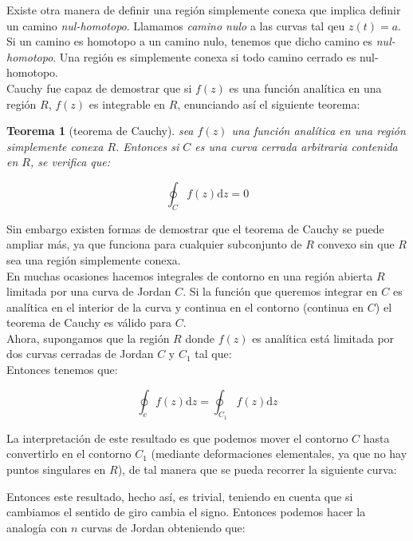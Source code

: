 \documentclass[12pt]{book}
\newcommand{\D}{\mathrm{d}}
\newtheorem{theorem}{Teorema}[section]
\begin{document}
Existe otra manera de definir una región simplemente conexa que implica definir un camino \textit{nul-homotopo}. Llamamos \textit{camino nulo} a las curvas tal qeu $z(t) = a$. Si un camino es homotopo a un camino nulo, tenemos que dicho camino es \textit{nul-homotopo}. Una región es simplemente conexa si todo camino cerrado es nul-homotopo. \\

Cauchy fue capaz de demostrar que si  $f(z)$ es una función analítica en una región $R$, $f(z)$ es integrable en $R$, enunciando así el siguiente teorema:

\begin{theorem}[teorema de Cauchy]
sea $f(z)$ una función analítica en una región simplemente conexa $R$. Entonces si $C$ es una curva cerrada arbitraria contenida en $R$, se verifica que:

$$ \oint_C f(z) \D z = 0 $$
\end{theorem}

Sin embargo existen formas de demostrar que el teorema de Cauchy se puede ampliar más, ya que funciona para cualquier subconjunto de $R$ convexo sin que $R$ sea una región simplemente conexa. \\


En muchas ocasiones hacemos integrales de contorno en una región abierta $R$ limitada por una curva de Jordan $C$. Si la función que queremos integrar en $C$ es analítica en el interior de la curva y continua en el contorno (continua en $C$) el teorema de Cauchy es válido para $C$.  \\


Ahora, supongamos que la región $R$ donde $f(z)$ es analítica está limitada por dos curvas cerradas de Jordan $C$ y $C_1$ tal que:  \\ %

Entonces tenemos que:

\begin{equation}
\oint_c f(z) \D z = \oint_{C_1} f(z) \D z 
\end{equation}

La interpretación de este resultado es que podemos mover el contorno $C$ hasta convertirlo en el contorno $C_1$ (mediante deformaciones elementales, ya que no hay puntos singulares en $R$), de tal manera que se pueda recorrer la siguiente curva: %


Entonces este resultado, hecho así, es trivial, teniendo en cuenta que si cambiamos el sentido de giro cambia el signo. Entonces podemos hacer la analogía con $n$ curvas de Jordan obteniendo que:
\end{document}
